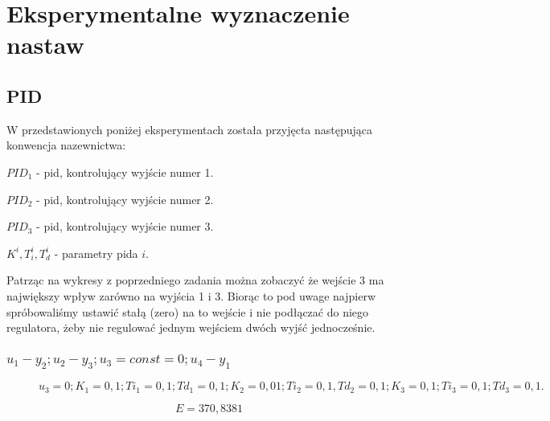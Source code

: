 \chapter{Eksperymentalne wyznaczenie nastaw}

\section{PID}
W przedstawionych poniżej eksperymentach została przyjęcta następująca konwencja nazewnictwa:

$PID_1$ - pid, kontrolujący wyjście numer 1.

\smallskip

$PID_2$ - pid, kontrolujący wyjście numer 2.

\smallskip

$PID_3$ - pid, kontrolujący wyjście numer 3.

\smallskip

$K^i, T_i^i, T_d^i$ - parametry pida $i$.

\smallskip

Patrząc na wykresy z poprzedniego zadania można zobaczyć że wejście 3 ma największy wpływ zarówno na wyjścia 1 i 3. Biorąc to pod uwage najpierw spróbowaliśmy ustawić stałą (zero) na to wejście i nie podłączać do niego regulatora, żeby nie regulować jednym wejściem dwóch wyjść jednocześnie.

\subsection{$u_1 - y_2; u_2 - y_3; u_3 = const = 0; u_4 - y_1$}

\begin{figure}[H]
    \centering
    
    \caption{$u_3 = 0; K_1 = 0,1; Ti_1 = 0,1; Td_1 = 0,1; K_2 = 0,01; Ti_2 = 0,1, Td_2 = 0,1; K_3 = 0,1; Ti_3 = 0,1; Td_3 = 0,1.$}
\end{figure}

\begin{equation}
    E = 370,8381
\end{equation}

%     

